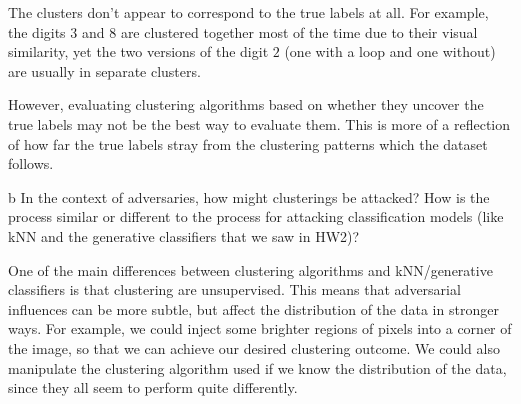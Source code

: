 \documentclass[expanded]{lkx_pset}
\begin{document}
\begin{parts}
\begin{parts}
		The clusters don't appear to correspond to the true labels at all. For example, the digits $3$ and $8$ are clustered together most of the time due to their visual similarity, yet the two versions of the digit $2$ (one with a loop and one without) are usually in separate clusters.

		However, evaluating clustering algorithms based on whether they uncover the true labels may not be the best way to evaluate them. This is more of a reflection of how far the true labels stray from the clustering patterns which the dataset follows.

		\begin{part}{b} In the context of adversaries, how might clusterings be
			attacked?  How is the process similar or different to the process
			for attacking classification models (like kNN and the generative classifiers that we saw in HW2)?
		\end{part}

		One of the main differences between clustering algorithms and kNN/generative classifiers is that clustering are unsupervised. This means that adversarial influences can be more subtle, but affect the distribution of the data in stronger ways. For example, we could inject some brighter regions of pixels into a corner of the image, so that we can achieve our desired clustering outcome. We could also manipulate the clustering algorithm used if we know the distribution of the data, since they all seem to perform quite differently.
	\end{parts}
\end{parts}
\end{document}
